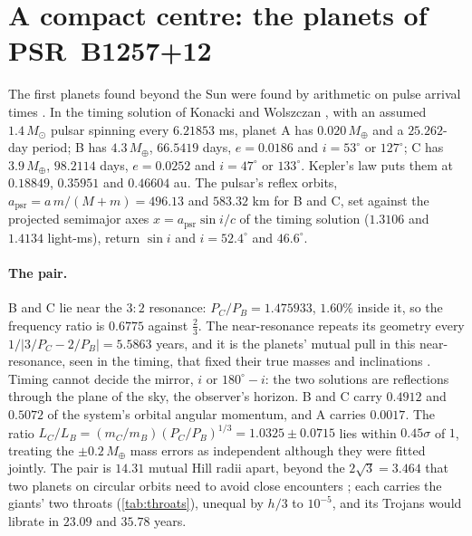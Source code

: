 \documentclass[11pt]{article}
\theoremstyle{definition}\newtheorem{definition}[theorem]{Definition}
\theoremstyle{remark}\newtheorem{remark}[theorem]{Remark}
\begin{document}
\section{A compact centre: the planets of PSR~B1257+12}\label{sec:pulsar}
The first planets found beyond the Sun were found by arithmetic on pulse arrival times \cite{WF92}. In the timing solution of Konacki and Wolszczan \cite{KW03}, with an assumed $1.4\,M_\odot$ pulsar spinning every $6.21853$ ms, planet A has $0.020\,M_\oplus$ and a $25.262$-day period; B has $4.3\,M_\oplus$, $66.5419$ days, $e=0.0186$ and $i=53^\circ$ or $127^\circ$; C has $3.9\,M_\oplus$, $98.2114$ days, $e=0.0252$ and $i=47^\circ$ or $133^\circ$. Kepler's law puts them at $0.18849$, $0.35951$ and $0.46604$ au. The pulsar's reflex orbits, $a_\mathrm{psr}=a\,m/(M+m)=496.13$ and $583.32$ km for B and C, set against the projected semimajor axes $x=a_\mathrm{psr}\sin i/c$ of the timing solution ($1.3106$ and $1.4134$ light-ms), return $\sin i$ and $i=52.4^\circ$ and $46.6^\circ$.

\paragraph{The pair.} B and C lie near the $3{:}2$ resonance: $P_C/P_B=1.475933$, $1.60\%$ inside it, so the frequency ratio is $0.6775$ against $\frac23$. The near-resonance repeats its geometry every $1/|3/P_C-2/P_B|=5.5863$ years, and it is the planets' mutual pull in this near-resonance, seen in the timing, that fixed their true masses and inclinations \cite{KW03}. Timing cannot decide the mirror, $i$ or $180^\circ-i$: the two solutions are reflections through the plane of the sky, the observer's horizon. B and C carry $0.4912$ and $0.5072$ of the system's orbital angular momentum, and A carries $0.0017$. The ratio $L_C/L_B=(m_C/m_B)(P_C/P_B)^{1/3}=1.0325\pm0.0715$ lies within $0.45\sigma$ of $1$, treating the $\pm0.2\,M_\oplus$ mass errors as independent although they were fitted jointly. The pair is $14.31$ mutual Hill radii apart, beyond the $2\sqrt3=3.464$ that two planets on circular orbits need to avoid close encounters \cite{Gladman}; each carries the giants' two throats (\cref{tab:throats}), unequal by $h/3$ to $10^{-5}$, and its Trojans would librate in $23.09$ and $35.78$ years.
\end{document}
